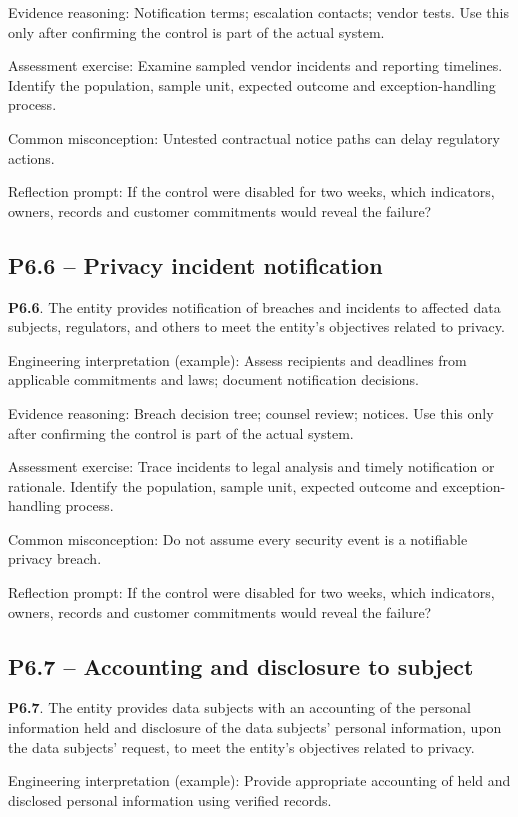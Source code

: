 \documentclass[10pt,oneside]{report}
\begin{document}
Evidence reasoning: Notification terms; escalation contacts; vendor tests. Use this only after confirming the control is part of the actual system.

Assessment exercise: Examine sampled vendor incidents and reporting timelines. Identify the population, sample unit, expected outcome and exception-handling process.

Common misconception: Untested contractual notice paths can delay regulatory actions.

Reflection prompt: If the control were disabled for two weeks, which indicators, owners, records and customer commitments would reveal the failure?

\subsection{P6.6 -- Privacy incident notification}
\begin{aicpabox}
\textbf{P6.6}. The entity provides notification of breaches and incidents to affected data subjects, regulators, and others to meet the entity's objectives related to privacy.\par{}
\end{aicpabox}
Engineering interpretation (example): Assess recipients and deadlines from applicable commitments and laws; document notification decisions.

Evidence reasoning: Breach decision tree; counsel review; notices. Use this only after confirming the control is part of the actual system.

Assessment exercise: Trace incidents to legal analysis and timely notification or rationale. Identify the population, sample unit, expected outcome and exception-handling process.

Common misconception: Do not assume every security event is a notifiable privacy breach.

Reflection prompt: If the control were disabled for two weeks, which indicators, owners, records and customer commitments would reveal the failure?

\subsection{P6.7 -- Accounting and disclosure to subject}
\begin{aicpabox}
\textbf{P6.7}. The entity provides data subjects with an accounting of the personal information held and disclosure of the data subjects' personal information, upon the data subjects' request, to meet the entity's objectives related to privacy.\par{}
\end{aicpabox}
Engineering interpretation (example): Provide appropriate accounting of held and disclosed personal information using verified records.
\end{document}
